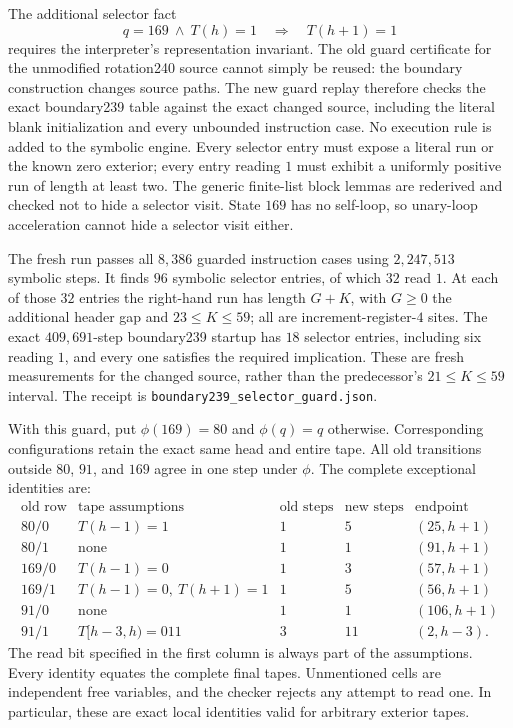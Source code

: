 The additional selector fact
\begin{equation}
q=169\ \land\ T(h)=1\quad\Longrightarrow\quad T(h+1)=1
\label{eq:new-selector-guard}
\end{equation}
requires the interpreter's representation invariant.  The old guard
certificate for the unmodified rotation240 source cannot simply be
reused: the boundary construction changes source paths.  The new
guard replay therefore checks the exact boundary239 table against
the exact changed source, including the literal blank initialization
and every unbounded instruction case.  No execution rule is added
to the symbolic engine.  Every selector entry must expose a literal
run or the known zero exterior; every entry reading $1$ must exhibit
a uniformly positive run of length at least two.  The generic
finite-list block lemmas are rederived and checked not to hide a
selector visit.  State $169$ has no self-loop, so unary-loop
acceleration cannot hide a selector visit either.

The fresh run passes all $8,386$ guarded instruction cases using
$2,247,513$ symbolic steps.  It finds $96$ symbolic selector entries,
of which $32$ read $1$.  At each of those $32$ entries the right-hand
run has length $G+K$, with $G\geq0$ the additional header gap and
$23\leq K\leq59$; all are increment-register-$4$ sites.  The exact
$409,691$-step boundary239 startup has $18$ selector entries, including
six reading $1$, and every one satisfies the required implication.
These are fresh measurements for the changed source, rather than
the predecessor's $21\leq K\leq59$ interval.  The receipt is
\texttt{boundary239\_selector\_guard.json}.

With this guard, put $\phi(169)=80$ and $\phi(q)=q$ otherwise.
Corresponding configurations retain the exact same head and entire
tape.  All old transitions outside $80$, $91$, and $169$ agree in
one step under $\phi$.  The complete exceptional identities are:
\[
\begin{array}{c|l|r|r|c}
\text{old row}&\text{tape assumptions}&\text{old steps}&\text{new steps}
&\text{endpoint}\\\hline
80/0&T(h-1)=1&1&5&(25,h+1)\\
80/1&\text{none}&1&1&(91,h+1)\\
169/0&T(h-1)=0&1&3&(57,h+1)\\
169/1&T(h-1)=0,\ T(h+1)=1&1&5&(56,h+1)\\
91/0&\text{none}&1&1&(106,h+1)\\
91/1&T[h-3,h)=011&3&11&(2,h-3).
\end{array}
\]
The read bit specified in the first column is always part of the
assumptions.  Every identity equates the complete final tapes.
Unmentioned cells are independent free variables, and the checker
rejects any attempt to read one.  In particular, these are exact
local identities valid for arbitrary exterior tapes.


